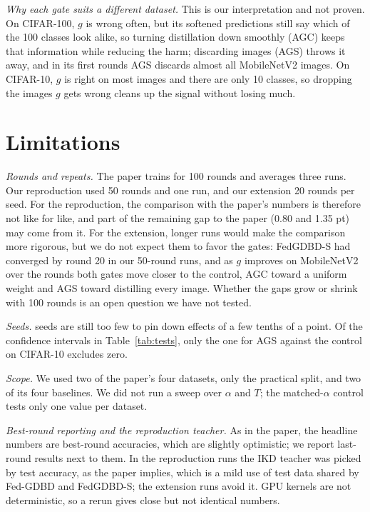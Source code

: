 \documentclass[conference]{IEEEtran}
\begin{document}
\textit{Why each gate suits a different dataset.} This is our interpretation and not proven. On CIFAR-100, $g$ is wrong often, but its softened predictions still say which of the 100 classes look alike, so turning distillation down smoothly (AGC) keeps that information while reducing the harm; discarding images (AGS) throws it away, and in its first rounds AGS discards almost all MobileNetV2 images. On CIFAR-10, $g$ is right on most images and there are only 10 classes, so dropping the images $g$ gets wrong cleans up the signal without losing much.

\section{Limitations}
\label{sec:limits}

\textit{Rounds and repeats.} The paper trains for 100 rounds and averages three runs. Our reproduction used 50 rounds and one run, and our extension 20 rounds per seed. For the reproduction, the comparison with the paper's numbers is therefore not like for like, and part of the remaining gap to the paper (0.80 and 1.35 pt) may come from it. For the extension, longer runs would make the comparison more rigorous, but we do not expect them to favor the gates: FedGDBD-S had converged by round 20 in our 50-round runs, and as $g$ improves on MobileNetV2 over the rounds both gates move closer to the control, AGC toward a uniform weight and AGS toward distilling every image. Whether the gaps grow or shrink with 100 rounds is an open question we have not tested.

\textit{Seeds.} \NSeeds{} seeds are still too few to pin down effects of a few tenths of a point. Of the confidence intervals in Table~\ref{tab:tests}, only the one for AGS against the control on CIFAR-10 excludes zero.

\textit{Scope.} We used two of the paper's four datasets, only the practical split, and two of its four baselines. We did not run a sweep over $\alpha$ and $T$; the matched-$\alpha$ control tests only one value per dataset.

\textit{Best-round reporting and the reproduction teacher.} As in the paper, the headline numbers are best-round accuracies, which are slightly optimistic; we report last-round results next to them. In the reproduction runs the IKD teacher was picked by test accuracy, as the paper implies, which is a mild use of test data shared by Fed-GDBD and FedGDBD-S; the extension runs avoid it. GPU kernels are not deterministic, so a rerun gives close but not identical numbers.
\end{document}
